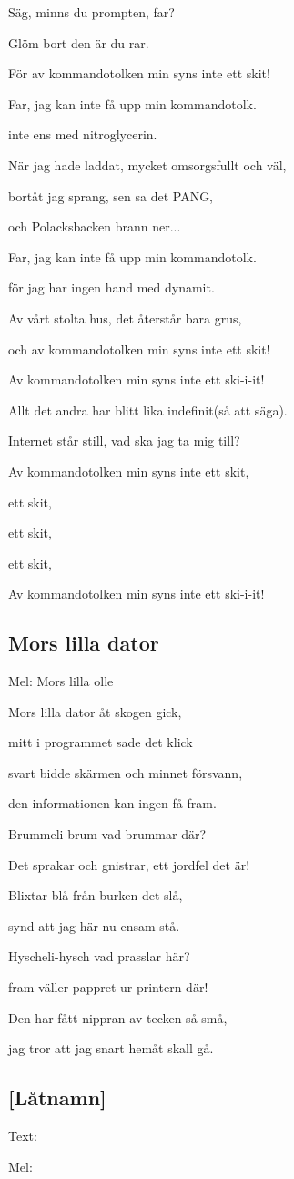 Säg, minns du prompten, far?

Glöm bort den är du rar.

För av kommandotolken min syns inte ett skit!\bigskip

Far, jag kan inte få upp min kommandotolk.

inte ens med nitroglycerin.

När jag hade laddat, mycket omsorgsfullt och väl,

bortåt jag sprang, sen sa det PANG,

och Polacksbacken brann ner...\bigskip

Far, jag kan inte få upp min kommandotolk.

för jag har ingen hand med dynamit.

Av vårt stolta hus, det återstår bara grus,

och av kommandotolken min syns inte ett skit!\bigskip

Av kommandotolken min syns inte ett ski-i-it!

Allt det andra har blitt lika indefinit(så att 
säga).

Internet står still, vad ska jag ta mig till?

Av kommandotolken min syns inte ett skit,

ett skit,

ett skit,

ett skit,

Av kommandotolken min syns inte ett ski-i-it!\bigskip 

\subsection{\textbf{Mors lilla dator}}

Mel: Mors lilla olle


Mors lilla dator åt skogen gick,

mitt i programmet sade det klick

svart bidde skärmen och minnet försvann,

den informationen kan ingen få fram.\bigskip

Brummeli-brum vad brummar där?

Det sprakar och gnistrar, ett jordfel det är!

Blixtar blå från burken det slå,

synd att jag här nu ensam stå.\bigskip

Hyscheli-hysch vad prasslar här?

fram väller pappret ur printern där!

Den har fått nippran av tecken så små,

jag tror att jag snart hemåt skall gå.\bigskip

\subsection{\textbf{[Låtnamn]}}

Text: 

Mel: 
\newpage